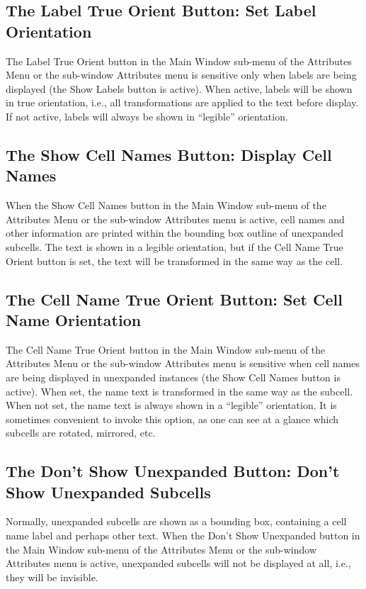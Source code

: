 \subsection{The {\cb Label True Orient} Button: Set Label Orientation}
The {\cb Label True Orient} button in the {\cb Main Window} sub-menu
of the {\cb Attributes Menu} or the sub-window {\cb Attributes} menu is
sensitive only when labels are being displayed (the {\cb Show Labels}
button is active).  When active, labels will be shown in true
orientation, i.e., all transformations are applied to the text before
display.  If not active, labels will always be shown in ``legible''
orientation.


\subsection{The {\cb Show Cell Names} Button: Display Cell Names}
When the {\cb Show Cell Names} button in the {\cb Main Window}
sub-menu of the {\cb Attributes Menu} or the sub-window {\cb
Attributes} menu is active, cell names and other information are
printed within the bounding box outline of unexpanded subcells.  The
text is shown in a legible orientation, but if the {\cb Cell Name True
Orient} button is set, the text will be transformed in the same way as
the cell.


\subsection{The {\cb Cell Name True Orient} Button: Set Cell Name Orientation}
The {\cb Cell Name True Orient} button in the {\cb Main Window}
sub-menu of the {\cb Attributes Menu} or the sub-window {\cb
Attributes} menu is sensitive when cell names are being displayed in
unexpanded instances (the {\cb Show Cell Names} button is active). 
When set, the name text is transformed in the same way as the subcell. 
When not set, the name text is always shown in a ``legible''
orientation.  It is sometimes convenient to invoke this option, as one
can see at a glance which subcells are rotated, mirrored, etc.


\subsection{The {\cb Don't Show Unexpanded} Button: Don't Show Unexpanded
 Subcells}
Normally, unexpanded subcells are shown as a bounding box, containing
a cell name label and perhaps other text.  When the {\cb Don't Show
Unexpanded} button in the {\cb Main Window} sub-menu of the {\cb
Attributes Menu} or the sub-window {\cb Attributes} menu is active,
unexpanded subcells will not be displayed at all, i.e., they will be
invisible.


